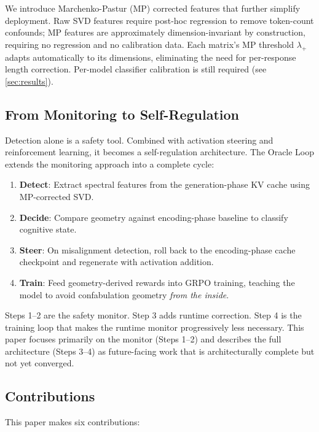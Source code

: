 We introduce Marchenko-Pastur (MP) corrected features that further
simplify deployment. Raw SVD features require post-hoc regression to
remove token-count confounds; MP features are approximately
dimension-invariant by construction, requiring no regression and no
calibration data. Each matrix's MP threshold $\lambda_+$ adapts
automatically to its dimensions, eliminating the need for per-response
length correction. Per-model classifier calibration is still required
(see \cref{sec:results}).

\subsection{From Monitoring to Self-Regulation}

Detection alone is a safety tool. Combined with activation steering
and reinforcement learning, it becomes a self-regulation architecture.
The Oracle Loop extends the monitoring approach into a complete cycle:

\begin{enumerate}[nosep]
  \item \textbf{Detect}: Extract spectral features from the generation-phase
    KV cache using MP-corrected SVD.
  \item \textbf{Decide}: Compare geometry against encoding-phase baseline to
    classify cognitive state.
  \item \textbf{Steer}: On misalignment detection, roll back to the
    encoding-phase cache checkpoint and regenerate with activation
    addition.
  \item \textbf{Train}: Feed geometry-derived rewards into GRPO training,
    teaching the model to avoid confabulation geometry \emph{from the
    inside}.
\end{enumerate}

Steps 1--2 are the safety monitor. Step 3 adds runtime correction.
Step 4 is the training loop that makes the runtime monitor progressively
less necessary. This paper focuses primarily on the monitor (Steps 1--2)
and describes the full architecture (Steps 3--4) as future-facing work
that is architecturally complete but not yet converged.

\subsection{Contributions}

This paper makes six contributions:

